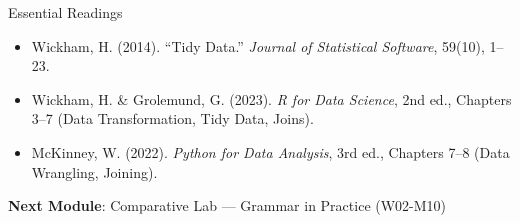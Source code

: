 \documentclass[10pt]{beamer}
\begin{document}
\begin{frame}{Essential Readings}
  \begin{itemize}
    \item Wickham, H. (2014). ``Tidy Data.'' \emph{Journal of Statistical
          Software}, 59(10), 1--23.
    \item Wickham, H. \& Grolemund, G. (2023). \emph{R for Data Science},
          2nd ed., Chapters 3--7 (Data Transformation, Tidy Data, Joins).
    \item McKinney, W. (2022). \emph{Python for Data Analysis}, 3rd ed.,
          Chapters 7--8 (Data Wrangling, Joining).
  \end{itemize}
  \vspace{6pt}
  \textbf{Next Module}: Comparative Lab --- Grammar in Practice (W02-M10)
\end{frame}
\end{document}
